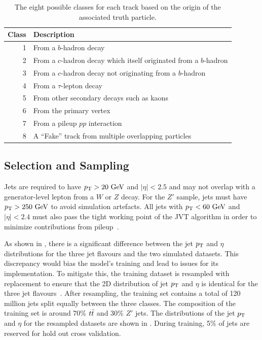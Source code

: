 \begin{table}
    \centering
    \begin{tabular}{rl}
        \toprule
        Class & Description                                                       \\
        \midrule
        1     & From a $b$-hadron decay                                           \\
        2     & From a $c$-hadron decay which itself originated from a $b$-hadron \\
        3     & From a $c$-hadron decay not originating from a $b$-hadron         \\
        4     & From a $\tau$-lepton decay                                        \\
        5     & From other secondary decays such as kaons                         \\
        6     & From the primary vertex                                           \\
        7     & From a pileup $pp$ interaction                                    \\
        8     & A ``Fake'' track from multiple overlapping particles              \\
        \bottomrule
    \end{tabular}
    \caption{The eight possible classes for each track based on the origin of the associated truth particle.}
    \label{tab:track_labels}
\end{table}

\subsection{Selection and Sampling}

Jets are required to have $\pt > 20~\GeV$ and $|\eta| < 2.5$ and may not overlap with a generator-level lepton from a $W$ or $Z$ decay.
For the $Z'$ sample, jets must have $\pt > 250~\GeV$ to avoid simulation artefacts.
All jets with $\pt < 60~\GeV$ and $|\eta| < 2.4$ must also pass the tight working point of the JVT algorithm in order to minimize contributions from pileup~\cite{JVT}.

As shown in , there is a significant difference between the jet $p_\mathrm{T}$ and $\eta$ distributions for the three jet flavours and the two simulated datasets.
This discrepancy would bias the model's training and lead to issues for its implementation.
To mitigate this, the training dataset is resampled with replacement to ensure that the 2D distribution of jet $p_\mathrm{T}$ and $\eta$ is identical for the three jet flavours~\cite{AlexThesis}.
After resampling, the training set contains a total of 120 million jets split equally between the three classes.
The composition of the training set is around 70\% $t\bar{t}$ and 30\% $Z'$ jets.
The distributions of the jet $p_\mathrm{T}$ and $\eta$ for the resampled datasets are shown in .
During training, 5\% of jets are reserved for hold out cross validation.

